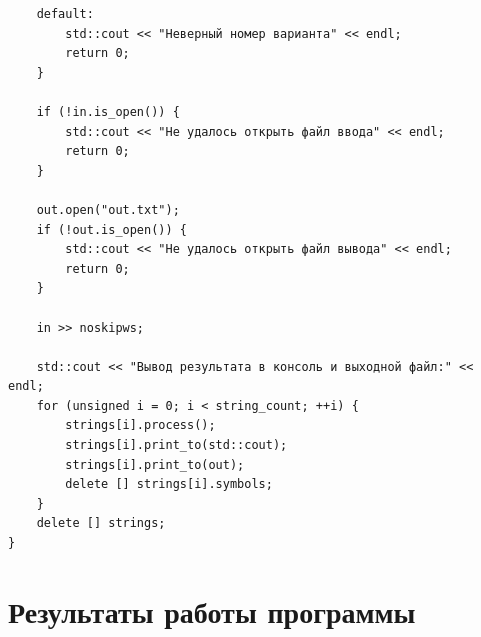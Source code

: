 \documentclass[12pt,a4paper]{extarticle}
\begin{document}
{\begin{verbatim}
    default:
        std::cout << "Неверный номер варианта" << endl;
        return 0;
    }

    if (!in.is_open()) {
        std::cout << "Не удалось открыть файл ввода" << endl;
        return 0;
    }

    out.open("out.txt");
    if (!out.is_open()) {
        std::cout << "Не удалось открыть файл вывода" << endl;
        return 0;
    }

    in >> noskipws;

    std::cout << "Вывод результата в консоль и выходной файл:" << endl;
    for (unsigned i = 0; i < string_count; ++i) {
        strings[i].process();
        strings[i].print_to(std::cout);
        strings[i].print_to(out);
        delete [] strings[i].symbols;
    }
    delete [] strings;
}

\end{verbatim}
}

\section{Результаты работы программы}
\end{document}
